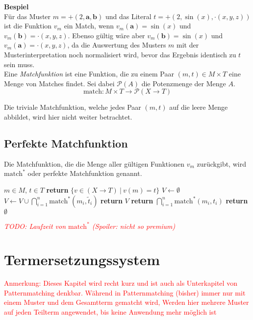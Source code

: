 \documentclass{article}
\begin{document}
\textbf{Bespiel}\\
Für das Muster $m = +(2, \mathbf a, \mathbf b)$ und das Literal $t = +(2, \sin(x), \cdot(x, y, z))$ ist die Funktion $v_m$ ein Match, wenn $v_m(\mathbf a) = \sin(x)$ und $v_m(\mathbf b) = \cdot(x, y, z)$. Ebenso gültig wäre aber $v_m(\mathbf b) = \sin(x)$ und $v_m(\mathbf a) = \cdot(x, y, z)$, da die Auswertung des Musters $m$ mit der Musterinterpretation noch normalisiert wird, bevor das Ergebnis identisch zu $t$ sein muss.\\

Eine \emph{Matchfunktion} ist eine Funktion, die zu einem Paar $(m, t) \in M \times T$ eine Menge von Matches findet. Sei dabei $\mathcal{P}(A)$ die Potenzmenge der Menge $A$.
$$\mathrm{match} \colon M \times T \rightarrow \mathcal{P}(X \rightarrow T)$$

Die triviale Matchfunktion, welche jedes Paar $(m, t)$ auf die leere Menge abbildet, wird hier nicht weiter betrachtet.

\subsection{Perfekte Matchfunktion}
Die Matchfunktion, die die Menge aller gültigen Funktionen $v_m$ zurückgibt, wird $\mathrm{match}^*$ oder perfekte Matchfunktion genannt.

\begin{algorithm}
\caption{$\mathrm{match}^* \colon M \times T \rightarrow \mathcal{P}(X \rightarrow T)$}\label{perfectMatch}
\begin{algorithmic}[1] %
\Require $m \in M$, $t \in T$
	\State \textbf{return} $\{v \in (X \rightarrow T) ~|~ v(m) = t\}$ 
\EndIf
{}
		\State $V \leftarrow \emptyset$
			\State $V \leftarrow V \cup \bigcap_{i = 1}^n {\mathrm{match}^*(m_i, \tilde t_i)}$
		\EndFor
		\State \textbf{return} $V$
	\Else
		\State \textbf{return} $\bigcap_{i = 1}^n {\mathrm{match}^*(m_i, t_i)}$
	\EndIf
\EndIf
\State \textbf{return} $\emptyset$
\end{algorithmic}
\end{algorithm}
\textcolor{red}{\textit{TODO: Laufzeit von $\mathrm{match}^*$ (Spoiler: nicht so premium)}}

\section{Termersetzungssystem}
\textcolor{red}{
\begin{itshape}
Anmerkung: Dieses Kapitel wird recht kurz und ist auch als Unterkapitel von Patternmatching denkbar. 
Während in Patternmatching (bisher) immer nur mit einem Muster und dem Gesamtterm gematcht wird, Werden hier mehrere Muster auf jeden Teilterm angewendet, bis keine Anwendung mehr möglich ist
\end{itshape}
}
\end{document}
